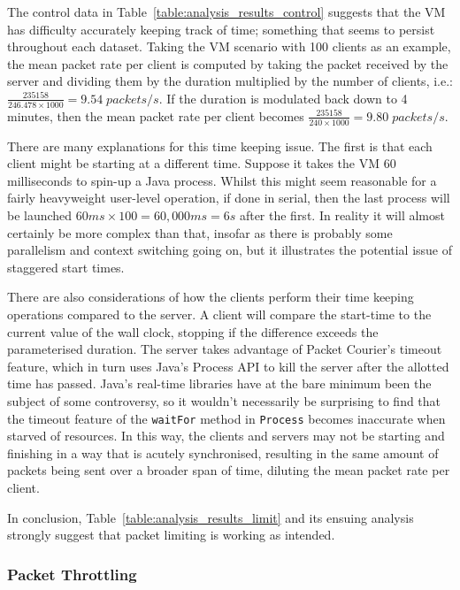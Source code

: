 The control data in Table~\ref{table:analysis_results_control} suggests that the VM has difficulty accurately keeping
track of time; something that seems to persist throughout each dataset. Taking the VM scenario with 100 clients as an
example, the mean packet rate per client is computed by taking the packet received by the server and dividing them by
the duration multiplied by the number of clients, i.e.: $\frac{235158}{246.478 \times 1000} = 9.54 \; packets/s$. If
the duration is modulated back down to 4 minutes, then the mean packet rate per client becomes
$\frac{235158}{240 \times 1000} = 9.80 \; packets/s$.

There are many explanations for this time keeping issue. The first is that each client might be starting at a
different time. Suppose it takes the VM 60 milliseconds to spin-up a Java process\cite{java_Process}. Whilst this
might seem reasonable for a fairly heavyweight user-level operation, if done in serial, then the last process will be
launched $60ms \times 100 = 60,000ms = 6s$ after the first. In reality it will almost certainly be more complex than
that, insofar as there is probably some parallelism and context switching going on, but it illustrates the potential
issue of staggered start times.

There are also considerations of how the clients perform their time keeping operations compared to the server. A
client will compare the start-time to the current value of the wall clock, stopping if the difference exceeds the
parameterised duration. The server takes advantage of Packet Courier's timeout feature, which in turn uses Java's
Process\cite{java_Process} API to kill the server after the allotted time has passed. Java's real-time libraries have
at the bare minimum been the subject of some controversy\cite{java_timeout_reliability}, so it wouldn't necessarily
be surprising to find that the timeout feature of the \texttt{waitFor} method in \texttt{Process} becomes inaccurate
when starved of resources. In this way, the clients and servers may not be starting and finishing in a way that is
acutely synchronised, resulting in the same amount of packets being sent over a broader span of time, diluting the
mean packet rate per client.

In conclusion, Table~\ref{table:analysis_results_limit} and its ensuing analysis strongly suggest that packet
limiting is working as intended.

\subsubsection{Packet Throttling}\label{subsubsection:throttle_analysis}

